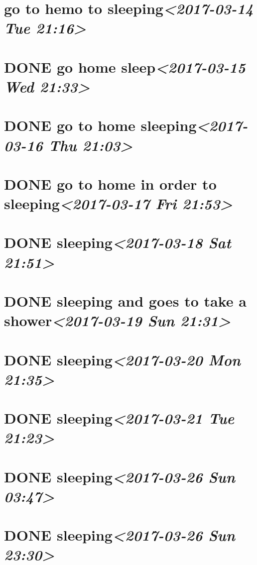 \documentclass[cyan]{elegantnote}
\begin{document}
\section{go to hemo to sleeping\textit{<2017-03-14 Tue 21:16>}}
\label{sec:org7cf3603}
\section{{\bfseries\sffamily DONE} go home sleep\textit{<2017-03-15 Wed 21:33>}}
\label{sec:org378e101}
\section{{\bfseries\sffamily DONE} go to home sleeping\textit{<2017-03-16 Thu 21:03>}}
\label{sec:org3e84fb0}
\section{{\bfseries\sffamily DONE} go to home in order to sleeping\textit{<2017-03-17 Fri 21:53>}}
\label{sec:org579e6f1}
\section{{\bfseries\sffamily DONE} sleeping\textit{<2017-03-18 Sat 21:51>}}
\label{sec:org910f61d}
\section{{\bfseries\sffamily DONE} sleeping and goes to take a shower\textit{<2017-03-19 Sun 21:31>}}
\label{sec:orgb856b2a}
\section{{\bfseries\sffamily DONE} sleeping\textit{<2017-03-20 Mon 21:35>}}
\label{sec:orgc5dd381}
\section{{\bfseries\sffamily DONE} sleeping\textit{<2017-03-21 Tue 21:23>}}
\label{sec:orge77ee32}
\section{{\bfseries\sffamily DONE} sleeping\textit{<2017-03-26 Sun 03:47>}}
\label{sec:org73c5add}
\section{{\bfseries\sffamily DONE} sleeping\textit{<2017-03-26 Sun 23:30>}}
\label{sec:org37634ac}
\end{document}
